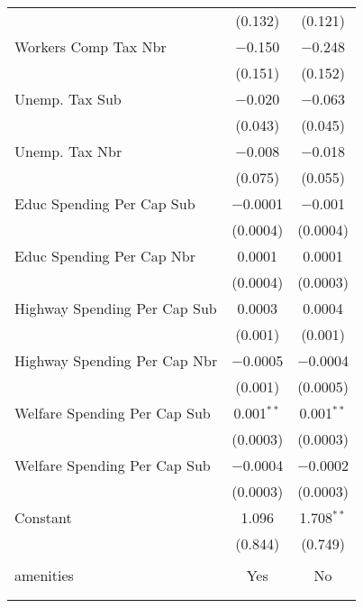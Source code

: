 \begin{table}[!htbp]
\begin{tabular}{@{\extracolsep{5pt}}lcc}
  & (0.132) & (0.121) \\ 
  Workers Comp Tax Nbr & $-$0.150 & $-$0.248 \\ 
  & (0.151) & (0.152) \\ 
  Unemp. Tax Sub & $-$0.020 & $-$0.063 \\ 
  & (0.043) & (0.045) \\ 
  Unemp. Tax Nbr & $-$0.008 & $-$0.018 \\ 
  & (0.075) & (0.055) \\ 
  Educ Spending Per Cap Sub & $-$0.0001 & $-$0.001 \\ 
  & (0.0004) & (0.0004) \\ 
  Educ Spending Per Cap Nbr & 0.0001 & 0.0001 \\ 
  & (0.0004) & (0.0003) \\ 
  Highway Spending Per Cap Sub & 0.0003 & 0.0004 \\ 
  & (0.001) & (0.001) \\ 
  Highway Spending Per Cap Nbr & $-$0.0005 & $-$0.0004 \\ 
  & (0.001) & (0.0005) \\ 
  Welfare Spending Per Cap Sub & 0.001$^{**}$ & 0.001$^{**}$ \\ 
  & (0.0003) & (0.0003) \\ 
  Welfare Spending Per Cap Sub & $-$0.0004 & $-$0.0002 \\ 
  & (0.0003) & (0.0003) \\ 
  Constant & 1.096 & 1.708$^{**}$ \\ 
  & (0.844) & (0.749) \\ 
 \hline \\[-1.8ex] 
amenities & Yes & No \\ 
\hline \\[-1.8ex] 
\hline 
\hline \\[-1.8ex] 
\end{tabular} 
\end{table} 

